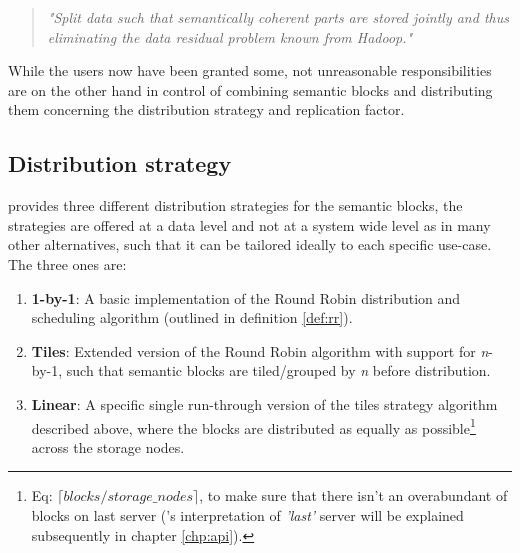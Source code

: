 \begin{quotation}
	\textit{"Split data such that semantically coherent parts are stored jointly and thus eliminating the data residual problem known from Hadoop."}
\end{quotation}
\vspace*{3mm}

While the users now have been granted some, not unreasonable responsibilities are \CodeName on the other hand in control of combining semantic blocks and distributing them concerning the distribution strategy and replication factor.

\subsection{Distribution strategy}
\CodeName provides three different distribution strategies for the semantic blocks, the strategies are offered at a data level and not at a system wide level as in many other alternatives, such that it can be tailored ideally to each specific use-case. The three ones are:

\begin{enumerate}
	\item \textbf{1-by-1}: A basic implementation of the Round Robin distribution and scheduling algorithm (outlined in definition \ref{def:rr}).
	\item \textbf{Tiles}: Extended version of the Round Robin algorithm with support for \textit{n}-by-1, such that semantic blocks are tiled/grouped by \textit{n} before distribution.
	\item \textbf{Linear}: A specific single run-through version of the tiles strategy algorithm described above, where the blocks are distributed as equally as possible\footnote{ Eq: $\lceil blocks / storage\_nodes\rceil$, to make sure that there isn't an overabundant of blocks on last server (\CodeNameShort's interpretation of \textit{'last'} server will be explained subsequently in chapter \ref{chp:api}).} across the storage nodes.
\end{enumerate}
\vspace*{5mm}


